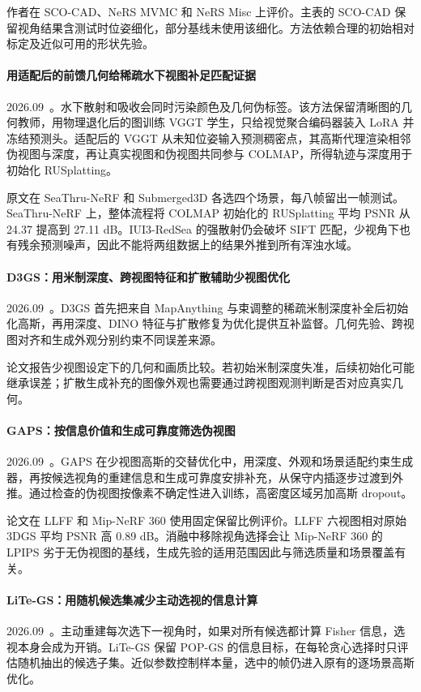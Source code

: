 作者在 SCO-CAD、NeRS MVMC 和 NeRS Misc 上评价。主表的 SCO-CAD 保留视角结果含测试时位姿细化，部分基线未使用该细化。方法依赖合理的初始相对标定及近似可用的形状先验。

\paragraph{用适配后的前馈几何给稀疏水下视图补足匹配证据}
2026.09~\cite{2609_18737}。水下散射和吸收会同时污染颜色及几何伪标签。该方法保留清晰图的几何教师，用物理退化后的图训练 VGGT 学生，只给视觉聚合编码器装入 LoRA 并冻结预测头。适配后的 VGGT 从未知位姿输入预测稠密点，其高斯代理渲染相邻伪视图与深度，再让真实视图和伪视图共同参与 COLMAP，所得轨迹与深度用于初始化 RUSplatting。

原文在 SeaThru-NeRF 和 Submerged3D 各选四个场景，每八帧留出一帧测试。SeaThru-NeRF 上，整体流程将 COLMAP 初始化的 RUSplatting 平均 PSNR 从 24.37 提高到 27.11 dB。IUI3-RedSea 的强散射仍会破坏 SIFT 匹配，少视角下也有残余预测噪声，因此不能将两组数据上的结果外推到所有浑浊水域。

\paragraph{D3GS：用米制深度、跨视图特征和扩散辅助少视图优化}
2026.09~\cite{2609_22941}。D3GS 首先把来自 MapAnything 与束调整的稀疏米制深度补全后初始化高斯，再用深度、DINO 特征与扩散修复为优化提供互补监督。几何先验、跨视图对齐和生成外观分别约束不同误差来源。

论文报告少视图设定下的几何和画质比较。若初始米制深度失准，后续初始化可能继承误差；扩散生成补充的图像外观也需要通过跨视图观测判断是否对应真实几何。

\paragraph{GAPS：按信息价值和生成可靠度筛选伪视图}
2026.09~\cite{2609_23436}。GAPS 在少视图高斯的交替优化中，用深度、外观和场景适配约束生成器，再按候选视角的重建信息和生成可靠度安排补充，从保守内插逐步过渡到外推。通过检查的伪视图按像素不确定性进入训练，高密度区域另加高斯 dropout。

论文在 LLFF 和 Mip-NeRF 360 使用固定保留比例评价。LLFF 六视图相对原始 3DGS 平均 PSNR 高 0.89 dB。消融中移除视角选择会让 Mip-NeRF 360 的 LPIPS 劣于无伪视图的基线，生成先验的适用范围因此与筛选质量和场景覆盖有关。

\paragraph{LiTe-GS：用随机候选集减少主动选视的信息计算}
2026.09~\cite{2609_30393}。主动重建每次选下一视角时，如果对所有候选都计算 Fisher 信息，选视本身会成为开销。LiTe-GS 保留 POP-GS 的信息目标，在每轮贪心选择时只评估随机抽出的候选子集。近似参数控制样本量，选中的帧仍进入原有的逐场景高斯优化。

